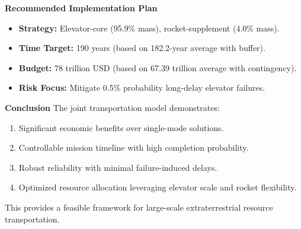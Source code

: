 \documentclass{article}
\begin{document}
\textbf{Recommended Implementation Plan}
\begin{itemize}
    \item \textbf{Strategy:} Elevator-core (95.9\% mass), rocket-supplement (4.0\% mass).
    \item \textbf{Time Target:} 190 years (based on 182.2-year average with buffer).
    \item \textbf{Budget:} 78 trillion USD (based on 67.39 trillion average with contingency).
    \item \textbf{Risk Focus:} Mitigate 0.5\% probability long-delay elevator failures.
\end{itemize}

\textbf{Conclusion}
The joint transportation model demonstrates:
\begin{enumerate}
    \item Significant economic benefits over single-mode solutions.
    \item Controllable mission timeline with high completion probability.
    \item Robust reliability with minimal failure-induced delays.
    \item Optimized resource allocation leveraging elevator scale and rocket flexibility.
\end{enumerate}
This provides a feasible framework for large-scale extraterrestrial resource transportation.
\end{document}
